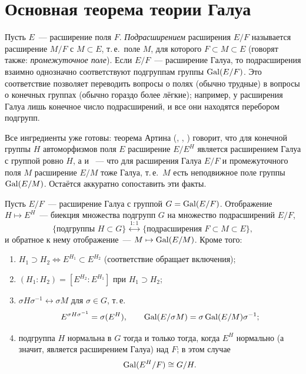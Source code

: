 \makeatletter
{}
\makeatother
\section{Основная теорема теории Галуа}

Пусть $E$~--- расширение поля $F$. \emph{Подрасширением} расширения $E/F$ называется расширение $M/F$ с $M\subset E$,
т.\,е.\ поле $M$, для которого $F\subset M\subset E$ (говорят также: \emph{промежуточное поле}). Если $E/F$~--- расширение
Галуа, то подрасширения взаимно однозначно соответствуют подгруппам группы $\operatorname{Gal}(E/F)$. Это соответствие позволяет
переводить вопросы о полях (обычно трудные) в вопросы о конечных группах (обычно гораздо более лёгкие); например,
у расширения Галуа лишь конечное число подрасширений, и все они находятся перебором подгрупп.

Все ингредиенты уже готовы: теорема Артина (, , ) говорит, что для конечной группы $H$
автоморфизмов поля $E$ расширение $E/E^H$ является расширением Галуа с группой ровно $H$, а  и ~--- что
для расширения Галуа $E/F$ и промежуточного поля $M$ расширение $E/M$ тоже Галуа, т.\,е.\ $M$ есть неподвижное поле
группы $\operatorname{Gal}(E/M)$. Остаётся аккуратно сопоставить эти факты.

\begin{theorem}
Пусть $E/F$~--- расширение Галуа с группой $G=\operatorname{Gal}(E/F)$. Отображение $H\mapsto E^H$~--- биекция множества подгрупп $G$
на множество подрасширений $E/F$,
\[
\{\text{подгруппы } H\subset G\}\ \overset{1:1}{\longleftrightarrow}\ \{\text{подрасширения }F\subset M\subset E\},
\]
и обратное к нему отображение~--- $M\mapsto\operatorname{Gal}(E/M)$. Кроме того:
\begin{enumerate}[label=\textup{(\alph*)}]
\item $H_1\supset H_2\iff E^{H_1}\subset E^{H_2}$ (соответствие обращает включения);
\item $(H_1:H_2)=[E^{H_2}:E^{H_1}]$ при $H_1\supset H_2$;
\item $\sigma H\sigma^{-1}\leftrightarrow\sigma M$ для $\sigma\in G$, т.\,е.
\[
E^{\sigma H\sigma^{-1}}=\sigma(E^H),\qquad \operatorname{Gal}(E/\sigma M)=\sigma\operatorname{Gal}(E/M)\sigma^{-1};
\]
\item подгруппа $H$ нормальна в $G$ тогда и только тогда, когда $E^H$ нормально (а значит, является расширением Галуа)
над $F$; в этом случае
\[
\operatorname{Gal}(E^H/F)\cong G/H .
\]
\end{enumerate}
\end{theorem}

